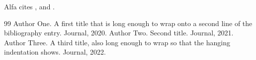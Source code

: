 \documentclass[10pt]{article}
\begin{document}
Alfa cites \cite{a}, \cite{b} and \cite{c}.
\begin{thebibliography}{99}
 Author One. A first title that is long enough to wrap onto a second line of the bibliography entry. Journal, 2020.
 Author Two. Second title. Journal, 2021.
 Author Three. A third title, also long enough to wrap so that the hanging indentation shows. Journal, 2022.
\end{thebibliography}
\end{document}
